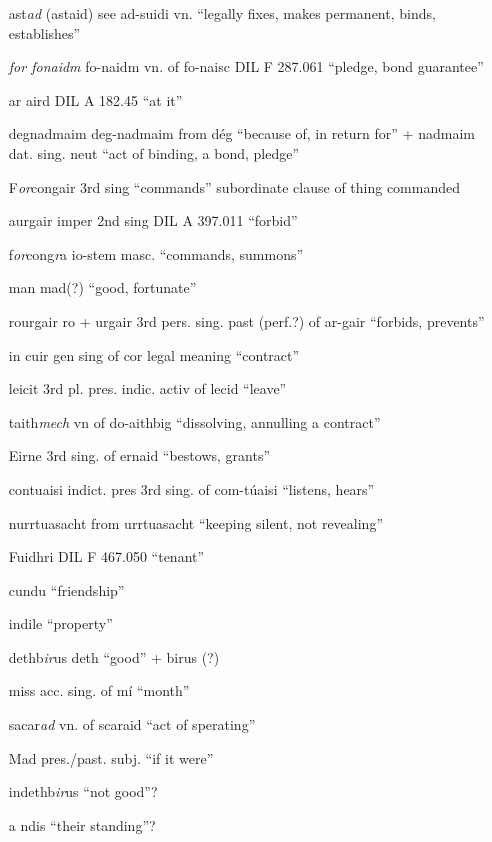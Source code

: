 \documentclass[11pt]{article}
\begin{document}
\begin{enumerate}
  \item[ast\emph{ad}] (astaid) see ad-suidi vn. \enquote{legally fixes, makes permanent, binds, establishes}
  \item[\emph{f\emph{or} fonaidm}] fo-naidm vn. of fo-naisc DIL F 287.061 \enquote{pledge, bond guarantee} 
  \item[ar aird] DIL A 182.45 \enquote{at it}
  \item[degnadmaim] deg-nadmaim from d\'{e}g \enquote{because of, in return for} + nadmaim dat. sing. neut \enquote{act of binding, a bond, pledge}
  \item[F\emph{or}congair] 3rd sing \enquote{commands} subordinate clause of thing commanded
  \item[aurgair] imper 2nd sing DIL A 397.011 \enquote{forbid}
  \item[f\emph{or}cong\emph{r}a] io-stem masc. \enquote{commands, summons}
  \item[man] mad(?) \enquote{good, fortunate}
  \item[rourgair] ro + urgair 3rd pers. sing. past (perf.?) of ar-gair \enquote{forbids, prevents}
  \item[in cuir] gen sing of cor legal meaning \enquote{contract}
  \item[leicit] 3rd pl. pres. indic. activ of lecid \enquote{leave}
  \item[taith\emph{mech}] vn of do-aithbig \enquote{dissolving, annulling a contract}
  \item[Eirne] 3rd sing. of ernaid \enquote{bestows, grants}
  \item[contuaisi] indict. pres 3rd sing. of com-t\'{u}aisi \enquote{listens, hears}
  \item[nurrtuasacht] from urrtuasacht \enquote{keeping silent, not revealing}
  \item[Fuidhri] DIL F 467.050 \enquote{tenant}
  \item[cundu] \enquote{friendship}
  \item[indile] \enquote{property}
  \item[dethb\emph{ir}us] deth \enquote{good} + birus (?)
  \item[miss] acc. sing. of m\'{i} \enquote{month}
  \item[sacar\emph{ad}] vn. of scaraid \enquote{act of sperating}
  \item[Mad] pres./past. subj. \enquote{if it were}
  \item[indethb\emph{ir}us] \enquote{not good}?
  \item[a ndis] \enquote{their standing}?

\end{enumerate}
\end{document}
